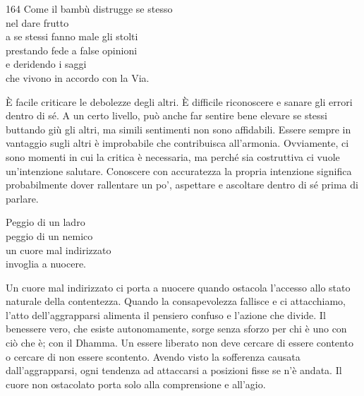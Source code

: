 
\begin{dhpVerse}{164}
\label{dhp-164}
Come il bambù distrugge se stesso\\
nel dare frutto\\
a se stessi fanno male gli stolti\\
prestando fede a false opinioni\\
e deridendo i saggi\\
che vivono in accordo con la Via.
\end{dhpVerse}

\begin{dhpRefl}
  È facile criticare le debolezze degli altri. È difficile riconoscere e sanare
  gli errori dentro di sé. A un certo livello, può anche far sentire bene
  elevare se stessi buttando giù gli altri, ma simili sentimenti non sono
  affidabili. Essere sempre in vantaggio sugli altri è improbabile che
  contribuisca all'armonia. Ovviamente, ci sono momenti in cui la critica è
  necessaria, ma perché sia costruttiva ci vuole un'intenzione salutare.
  Conoscere con accuratezza la propria intenzione significa probabilmente dover
  rallentare un po', aspettare e ascoltare dentro di sé prima di parlare.
\end{dhpRefl}


\begin{dhpVerse}{42}
\label{dhp-42}
Peggio di un ladro\\
peggio di un nemico\\
un cuore mal indirizzato\\
invoglia a nuocere.
\end{dhpVerse}

\begin{dhpRefl}
  Un cuore mal indirizzato ci porta a nuocere quando ostacola l'accesso allo
  stato naturale della contentezza. Quando la consapevolezza fallisce e ci
  attacchiamo, l'atto dell'aggrapparsi alimenta il pensiero confuso e l'azione
  che divide. Il benessere vero, che esiste autonomamente, sorge senza sforzo
  per chi è uno con ciò che è; con il Dhamma. Un essere liberato non deve
  cercare di essere contento o cercare di non essere scontento. Avendo visto la
  sofferenza causata dall'aggrapparsi, ogni tendenza ad attaccarsi a posizioni
  fisse se n'è andata. Il cuore non ostacolato porta solo alla comprensione e
  all'agio.
\end{dhpRefl}


